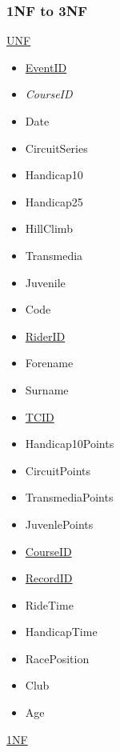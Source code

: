 \subsubsection{1NF to 3NF}

\underline{UNF}

\begin{itemize}
\item \underline{EventID}
\item \emph{CourseID}
\item Date
\item CircuitSeries
\item Handicap10
\item Handicap25
\item HillClimb
\item Transmedia
\item Juvenile
\item Code
\item \underline{RiderID}
\item Forename
\item Surname
\item \underline{TCID}
\item Handicap10Points
\item CircuitPoints
\item TransmediaPoints
\item JuvenlePoints
\item \underline{CourseID}
\item \underline{RecordID}
\item RideTime
\item HandicapTime
\item RacePosition
\item Club
\item Age
\end{itemize}

\underline{1NF}

